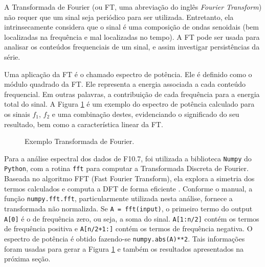 A Transformada de Fourier (ou FT, uma abreviação do inglês \textit{Fourier Transform}) não requer que um sinal seja periódico para ser utilizada. Entretanto, ela intrinsecamente considera que o sinal é uma composição de ondas senoidais (bem localizadas na frequência e mal localizadas no tempo). A FT pode ser usada para analisar os conteúdos frequenciais de um sinal, e assim investigar persistências da série. 

Uma aplicação da FT é o chamado espectro de potência. Ele é definido como o módulo quadrado da FT. Ele representa a energia associada a cada conteúdo frequencial. Em outras palavras, a contribuição de cada frequência para a energia total do sinal. A Figura \ref{fig:FT_exemplo} é um exemplo do espectro de potência calculado para os sinais $f_{1}$, $f_{2}$ e uma combinação destes, evidenciando o significado do seu resultado, bem como a característica linear da FT.

\begin{figure}[ht!]
	\caption{Exemplo Transformada de Fourier.}
	\vspace{1mm}	%
	\begin{center}
	\end{center}
	\vspace{1mm}	%
	\label{fig:FT_exemplo}
\end{figure}

Para a análise espectral dos dados de F10.7, foi utilizada a biblioteca \texttt{Numpy} do \texttt{Python}, com a rotina \texttt{fft} para computar a Transformada Discreta de Fourier. Baseada no algoritmo FFT (Fast Fourier  Transform), ela explora a simetria dos termos calculados e computa a DFT de forma eficiente \cite{cooley1965algorithm}. Conforme o manual, a função \texttt{numpy.fft.fft}, particularmente utilizada  nesta análise, fornece a transformada não normalizda. Se \texttt{A = fft(input)}, o primeiro termo do output \texttt{A[0]} é o de frequência zero, ou seja, a soma do sinal. \texttt{A[1:n/2]} contém os termos de frequência positiva e \texttt{A[n/2+1:]} contém os termos de frequência negativa. O espectro de potência é obtido fazendo-se \texttt{numpy.abs(A)**2}. Tais informações foram usadas para gerar a Figura \ref{fig:FT_exemplo} e também os resultados apresentados na próxima seção.
